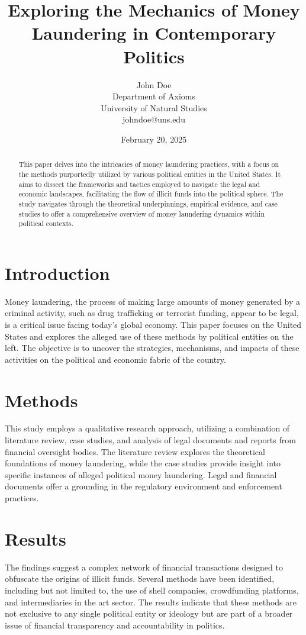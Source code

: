 \documentclass{article}
\title{Exploring the Mechanics of Money Laundering in Contemporary Politics}
\author{John Doe \\ Department of Axioms \\ University of Natural Studies \\ johndoe@uns.edu}
\date{February 20, 2025}
\begin{document}
\maketitle

\begin{abstract}
This paper delves into the intricacies of money laundering practices, with a focus on the methods purportedly utilized by various political entities in the United States. It aims to dissect the frameworks and tactics employed to navigate the legal and economic landscapes, facilitating the flow of illicit funds into the political sphere. The study navigates through the theoretical underpinnings, empirical evidence, and case studies to offer a comprehensive overview of money laundering dynamics within political contexts.
\end{abstract}

\section{Introduction}
Money laundering, the process of making large amounts of money generated by a criminal activity, such as drug trafficking or terrorist funding, appear to be legal, is a critical issue facing today's global economy. This paper focuses on the United States and explores the alleged use of these methods by political entities on the left. The objective is to uncover the strategies, mechanisms, and impacts of these activities on the political and economic fabric of the country.

\section{Methods}
This study employs a qualitative research approach, utilizing a combination of literature review, case studies, and analysis of legal documents and reports from financial oversight bodies. The literature review explores the theoretical foundations of money laundering, while the case studies provide insight into specific instances of alleged political money laundering. Legal and financial documents offer a grounding in the regulatory environment and enforcement practices.

\section{Results}
The findings suggest a complex network of financial transactions designed to obfuscate the origins of illicit funds. Several methods have been identified, including but not limited to, the use of shell companies, crowdfunding platforms, and intermediaries in the art sector. The results indicate that these methods are not exclusive to any single political entity or ideology but are part of a broader issue of financial transparency and accountability in politics.
\end{document}
